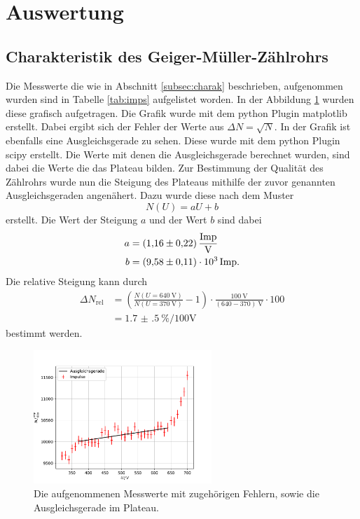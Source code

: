 \section{Auswertung}
\label{sec:Auswertung}
\subsection{Charakteristik des Geiger-Müller-Zählrohrs}
\label{subsec:auscharak}
Die Messwerte die wie in Abschnitt \ref{subsec:charak} beschrieben, aufgenommen wurden sind in Tabelle \ref{tab:imps} aufgelistet worden.
In der Abbildung \ref{fig:imps} wurden diese grafisch aufgetragen.
Die Grafik wurde mit dem python Plugin matplotlib \cite{matplotlib} erstellt.
Dabei ergibt sich der Fehler der Werte aus $\Delta N = \sqrt{N}$.
In der Grafik  ist ebenfalls eine Ausgleichsgerade zu sehen.
Diese wurde mit dem python Plugin scipy \cite{scipy} erstellt.
Die Werte mit denen die Ausgleichsgerade berechnet wurden, sind dabei die Werte die das Plateau bilden.
Zur Bestimmung der Qualität des Zählrohrs wurde nun die Steigung des Plateaus mithilfe der zuvor genannten Ausgleichsgeraden angenähert.
Dazu wurde diese nach dem Muster 
\begin{equation*}
  N(U)=aU+b
\end{equation*} 
erstellt.
Die Wert der Steigung $a$ und der Wert $b$ sind dabei
\begin{align*}
  a &= \SI{1.16(22)}{\frac{\text{Imp}}{\V}} \\
  b &= \SI{9.58(11)e03}{\text{Imp}}.\\
\end{align*}
Die relative Steigung kann durch
\begin{align*}
    \Delta N_\text{rel} &= \left( \frac{N(U=\SI{640}{\volt})}{N(U=\SI{370}{\volt})} - 1 \right) \cdot \frac{\SI{100}{\volt}}{(640-370)\:\si{\volt}} \cdot 100 \\
             &= \SI{1.7(5)}{\percent\per100\volt}
\end{align*}
bestimmt werden.
\begin{figure}
  \centering
  \includegraphics[width=0.6\textwidth]{content/data/kennlinie.pdf}
  \caption{Die aufgenommenen Messwerte mit zugehörigen Fehlern, sowie die Ausgleichsgerade im Plateau.}
  \label{fig:imps}
\end{figure}


